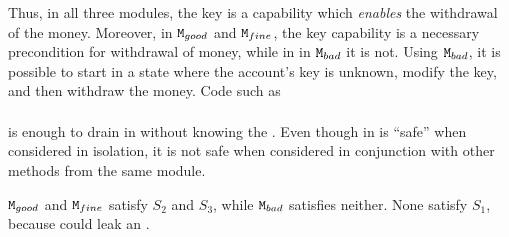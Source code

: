 \begin{example}
Thus, in all three modules, the key is a capability which \emph{enables} the withdrawal of the money. 
Moreover, in $\mbox{\normalfont{\texttt{M}}}_{{good}}$ and $\mbox{\normalfont{\texttt{M}}}_{{fine}}$, the key capability
is a necessary precondition for withdrawal of money, while in %
 in $\mbox{\normalfont{\texttt{M}}}_{{bad}}$ it is not. %
Using $\mbox{\normalfont{\texttt{M}}}_{{bad}}$, it is possible to start in a state where the account's key is unknown, modify the key, and then withdraw the money. 
Code   such as 
\\ 
$\ \strut \hspace{.2in} $  
\\ 
is enough to drain   in \ModB without knowing the \password.
Even though   in  \ModB is ``safe'' when considered in isolation, it is not safe when considered in conjunction with other methods from the same module. 

$\mbox{\normalfont{\texttt{M}}}_{{good}}$ and $\mbox{\normalfont{\texttt{M}}}_{{fine}}$ satisfy $S_2$ and $S_3$, while $\mbox{\normalfont{\texttt{M}}}_{{bad}}$ satisfies neither. 
None  satisfy $S_1$, because    could leak %
an .

\end{example}
 


